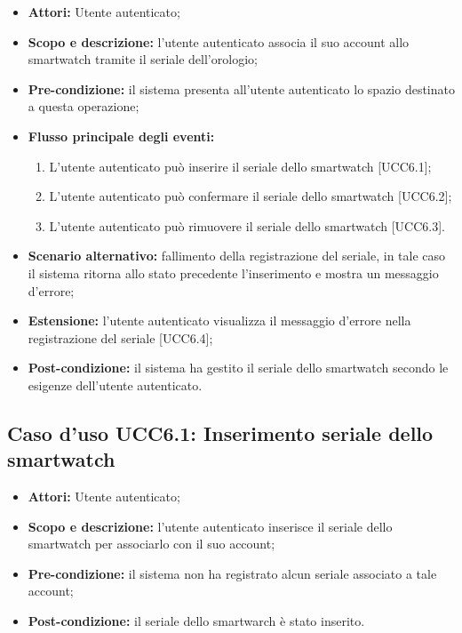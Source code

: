 \begin{itemize}
\item \textbf{Attori:} Utente autenticato;
\item \textbf{Scopo e descrizione:} l'utente autenticato associa il suo account allo smartwatch tramite il seriale dell'orologio;
\item \textbf{Pre-condizione:} il sistema presenta all'utente autenticato lo spazio destinato a questa operazione;
\item \textbf{Flusso principale degli eventi:}
\begin{enumerate}
\item L'utente autenticato può inserire il seriale dello smartwatch [UCC6.1];
\item L'utente autenticato può confermare il seriale dello smartwatch [UCC6.2];
\item L'utente autenticato può rimuovere il seriale dello smartwatch [UCC6.3].
\end{enumerate}
\item \textbf{Scenario alternativo:} fallimento della registrazione del seriale, in tale caso il sistema ritorna allo stato precedente l'inserimento e mostra un messaggio d'errore;
\item \textbf{Estensione:} l'utente autenticato visualizza il messaggio d'errore nella registrazione del seriale [UCC6.4];
\item \textbf{Post-condizione:} il sistema ha gestito il seriale dello smartwatch secondo le esigenze dell'utente autenticato.
\end{itemize}

\subsection{Caso d'uso UCC6.1: Inserimento seriale dello smartwatch}

\begin{itemize}
\item \textbf{Attori:} Utente autenticato;
\item \textbf{Scopo e descrizione:} l'utente autenticato inserisce il seriale dello smartwatch per associarlo con il suo account;
\item \textbf{Pre-condizione:} il sistema non ha registrato alcun seriale associato a tale account;
\item \textbf{Post-condizione:} il seriale dello smartwarch è stato inserito.
\end{itemize}

